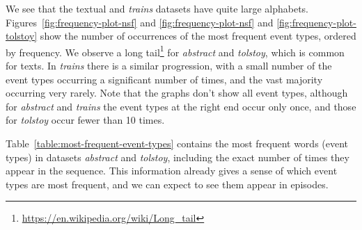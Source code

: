 We see that the textual and \emph{trains} datasets have quite large alphabets. Figures~\ref{fig:frequency-plot-nsf} and \ref{fig:frequency-plot-nsf} and \ref{fig:frequency-plot-tolstoy} show the number of occurrences of the most frequent event types, ordered by frequency. We observe a long tail\footnote{\url{https://en.wikipedia.org/wiki/Long_tail}} for \emph{abstract} and \emph{tolstoy}, which is common for texts. In \emph{trains} there is a similar progression, with a small number of the event types occurring a significant number of times, and the vast majority occurring very rarely. Note that the graphs don't show all event types, although for \emph{abstract} and \emph{trains} the event types at the right end occur only once, and those for \emph{tolstoy} occur fewer than 10 times.

Table~\ref{table:most-frequent-event-types} contains the most frequent words (event types) in datasets \emph{abstract} and \emph{tolstoy}, including the exact number of times they appear in the sequence. This information already gives a sense of which event types are most frequent, and we can expect to see them appear in episodes.

